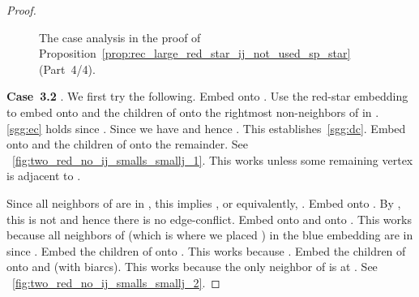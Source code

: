 \documentclass[11pt,a4paper,colorlinks=true,urlcolor=blue,citecolor=red]{article}
\theoremstyle{plain}
\newcommand{\case}[1]{\par\vspace{.5\baselineskip}\noindent\textbf{\sffamily Case~#1}}
\begin{document}
\begin{proof}
  \begin{figure}
    \centering\hfil {}\hfil {}\hfil {}\hfil {}\hfil \label{fig:two_red_no_ij_4}
    \caption{The case analysis in the proof of
      Proposition~\ref{prop:rec_large_red_star_ij_not_used_sp_star}
      (Part~4/4).}
  \end{figure}


  \case{3.2} . We first try the following. Embed  onto
  . Use the red-star embedding to embed  onto  and the
  children of  onto the rightmost  non-neighbors of  in
  . \ref{sgg:ec} holds since . Since
   we have  and hence
  . This
  establishes~\ref{sgg:dc}. Embed  onto  and the children of 
  onto the remainder. See
  \figurename~\ref{fig:two_red_no_ij_smalls_smallj_1}. This works unless
  some remaining vertex is adjacent to .

  Since all neighbors of  are in , this implies , or equivalently, . Embed  onto
  . By , this is not  and hence there
  is no edge-conflict. Embed  onto  and  onto . This works
  because all neighbors of  (which is where we placed )
  in the blue embedding are in  since . Embed the
  children of  onto . This works because
  . Embed the children of  onto
   and  (with biarcs). This works
  because the only neighbor of  is at . See
  \figurename~\ref{fig:two_red_no_ij_smalls_smallj_2}.
\end{proof}
\end{document}
